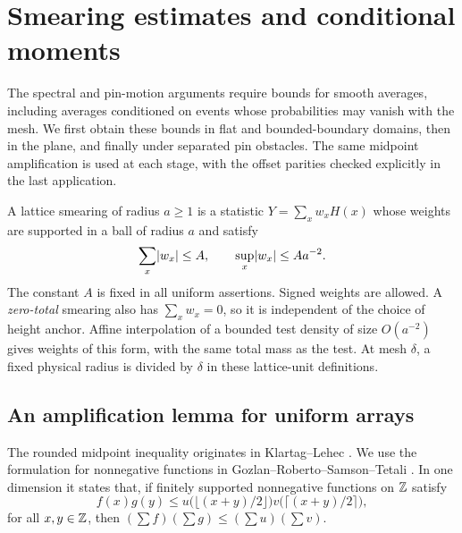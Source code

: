 \section{Smearing estimates and conditional moments}\label{sec:moments}

The spectral and pin-motion arguments require bounds for smooth averages,
including averages conditioned on events whose probabilities may vanish
with the mesh.  We first obtain these bounds in flat and bounded-boundary
domains, then in the plane, and finally under separated pin obstacles.
The same midpoint amplification is used at each stage, with the offset
parities checked explicitly in the last application.

A lattice smearing of radius $a\geq1$ is a statistic
$Y=\sum_x w_xH(x)$ whose weights are supported in a ball of radius $a$
and satisfy
\begin{equation}\label{eq:normalized-weights}
 \sum_x\lvert w_x\rvert\leq A,\qquad
 \sup_x\lvert w_x\rvert\leq A a^{-2}.
\end{equation}
The constant $A$ is fixed in all uniform assertions.  Signed weights are
allowed.  A \emph{zero-total} smearing also has $\sum_xw_x=0$, so it is
independent of the choice of height anchor.  Affine interpolation of a
bounded test density of size $O(a^{-2})$ gives weights of this form, with
the same total mass as the test.  At mesh $\delta$, a fixed physical
radius is divided by $\delta$ in these lattice-unit definitions.

\subsection{An amplification lemma for uniform arrays}

The rounded midpoint inequality originates in
Klartag--Lehec \cite[Theorem~1.4]{KlartagLehec2019}.  We use the
formulation for nonnegative functions in
Gozlan--Roberto--Samson--Tetali \cite[Theorem~3]{GRST2019}.
In one dimension it states that, if finitely supported nonnegative
functions on $\mathbb Z$ satisfy
\[
 f(x)g(y)\leq
 u\bigl(\lfloor(x+y)/2\rfloor\bigr)
 v\bigl(\lceil(x+y)/2\rceil\bigr),
\]
for all $x,y\in\mathbb Z$, then $(\sum f)(\sum g)\leq(\sum u)(\sum v)$.

